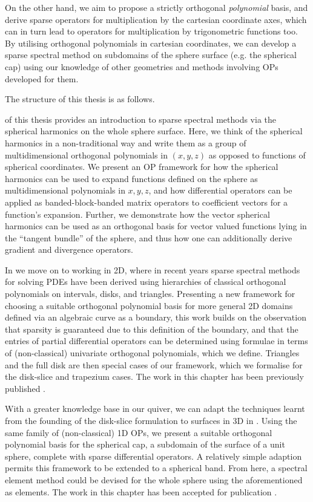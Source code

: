 On the other hand, we aim to propose a strictly orthogonal \textit{polynomial} basis, and derive sparse operators for multiplication by the cartesian coordinate axes, which can in turn lead to operators for multiplication by trigonometric functions too. By utilising orthogonal polynomials in cartesian coordinates, we can develop a sparse spectral method on subdomains of the sphere surface (e.g. the spherical cap) using our knowledge of other geometries and methods involving OPs developed for them.

The structure of this thesis is as follows.

 of this thesis provides an introduction to sparse spectral methods via the spherical harmonics on the whole sphere surface. Here, we think of the spherical harmonics in a non-traditional way and write them as a group of multidimensional orthogonal polynomials in $(x,y,z)$ as opposed to functions of spherical coordinates. We present an OP framework for how the spherical harmonics can be used to expand functions defined on the sphere as multidimensional polynomials in $x, y, z$, and how differential operators can be applied as banded-block-banded matrix operators to coefficient vectors for a function's expansion. Further, we demonstrate how the vector spherical harmonics can be used as an orthogonal basis for vector valued functions lying in the \enquote{tangent bundle} of the sphere, and thus how one can additionally derive gradient and divergence operators.

In  we move on to working in 2D, where in recent years sparse spectral methods for solving PDEs have been derived using hierarchies of classical orthogonal polynomials on intervals, disks, and triangles. Presenting a new framework for choosing a suitable orthogonal polynomial basis for more general 2D domains defined via an algebraic curve as a boundary, this work builds on the observation that sparsity is guaranteed due to this definition of the boundary, and that the entries of partial differential operators can be determined using formulae in terms of (non-classical) univariate orthogonal polynomials, which we define. Triangles and the full disk are then special cases of our framework, which we formalise for the disk-slice and trapezium cases. The work in this chapter has been previously published \cite{snowball2019sparse}.

With a greater knowledge base in our quiver, we can adapt the techniques learnt from the founding of the disk-slice formulation to surfaces in 3D in . Using the same family of (non-classical) 1D OPs, we present a suitable orthogonal polynomial basis for the spherical cap, a subdomain of the surface of a unit sphere, complete with sparse differential operators. A relatively simple adaption permits this framework to be extended to a spherical band. From here, a spectral element method could be devised for the whole sphere using the aforementioned as elements. The work in this chapter has been accepted for publication \cite{snowball2020sparse}.

